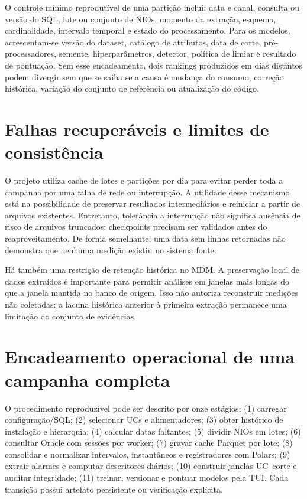 O controle mínimo reprodutível de uma partição inclui: data e canal, consulta ou versão do SQL, lote ou conjunto de NIOs, momento da extração, esquema, cardinalidade, intervalo temporal e estado do processamento. Para os modelos, acrescentam-se versão do dataset, catálogo de atributos, data de corte, pré-processadores, semente, hiperparâmetros, detector, política de limiar e resultado de pontuação. Sem esse encadeamento, dois rankings produzidos em dias distintos podem divergir sem que se saiba se a causa é mudança do consumo, correção histórica, variação do conjunto de referência ou atualização do código.

\section{Falhas recuperáveis e limites de consistência}\label{falhas-recuperuxe1veis-e-limites-de-consistuxeancia}

O projeto utiliza cache de lotes e partições por dia para evitar perder toda a campanha por uma falha de rede ou interrupção. A utilidade desse mecanismo está na possibilidade de preservar resultados intermediários e reiniciar a partir de arquivos existentes. Entretanto, tolerância a interrupção não significa ausência de risco de arquivos truncados: checkpoints precisam ser validados antes do reaproveitamento. De forma semelhante, uma data sem linhas retornadas não demonstra que nenhuma medição existiu no sistema fonte.

Há também uma restrição de retenção histórica no MDM. A preservação local de dados extraídos é importante para permitir análises em janelas mais longas do que a janela mantida no banco de origem. Isso não autoriza reconstruir medições não coletadas: a lacuna histórica anterior à primeira extração permanece uma limitação do conjunto de evidências.

\section{Encadeamento operacional de uma campanha completa}\label{encadeamento-operacional-de-uma-campanha-completa}

O procedimento reproduzível pode ser descrito por onze estágios: (1) carregar configuração/SQL; (2) selecionar UCs e alimentadores; (3) obter histórico de instalação e hierarquia; (4) calcular datas faltantes; (5) dividir NIOs em lotes; (6) consultar Oracle com sessões por worker; (7) gravar cache Parquet por lote; (8) consolidar e normalizar intervalos, instantâneos e registradores com Polars; (9) extrair alarmes e computar descritores diários; (10) construir janelas UC--corte e auditar integridade; (11) treinar, versionar e pontuar modelos pela TUI. Cada transição possui artefato persistente ou verificação explícita.

